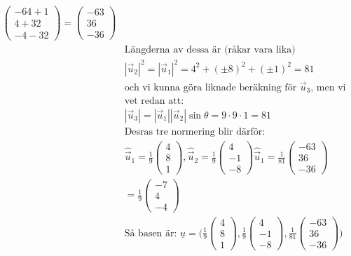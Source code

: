 \begin{multicols}{2}
\begin{align*}
  \begin{pmatrix} -64+1 \\ 4+32 \\ -4-32 \end{pmatrix} =
  \begin{pmatrix} -63 \\ 36 \\ -36 \end{pmatrix} \\
  &\text{Längderna av dessa är (råkar vara lika)}  \\
  &|\vec{u}_2|^2 = |\vec{u}_1|^2 = 4^2 + {(\pm{8})}^2 + {(\pm{1})}^2 = 81 \\
  &\text{och vi kunna göra liknade beräkning för } \vec{u}_3 \text{, men vi} \\
  &\text{vet redan att:} \\
  &|\vec{u}_3| = |\vec{u}_1||\vec{u}_2|\sin{\theta}=9\cdot{}9\cdot{}1=81 \\
  &\text{Desras tre normering blir därför:} \\
  &\hat\vec{u}_1 = \frac{1}{9}\begin{pmatrix} 4 \\ 8 \\ 1 \end{pmatrix},
  \hat\vec{u}_2 = \frac{1}{9}\begin{pmatrix} 4 \\ -1 \\ -8 \end{pmatrix}
  \hat\vec{u}_1 = \frac{1}{81}\begin{pmatrix} -63 \\ 36 \\ -36 \end{pmatrix} \\
  &=\frac{1}{9}\begin{pmatrix} -7 \\ 4 \\ -4 \end{pmatrix} \\
  &\text{Så basen är: }
  \underline{u} = \Bigg(
  \frac{1}{9}\begin{pmatrix} 4 \\ 8 \\ 1 \end{pmatrix},
  \frac{1}{9}\begin{pmatrix} 4 \\ -1 \\ -8 \end{pmatrix},
  \frac{1}{81}\begin{pmatrix} -63 \\ 36 \\ -36 \end{pmatrix}
  \Bigg) \\
\end{align*}


\end{multicols}
